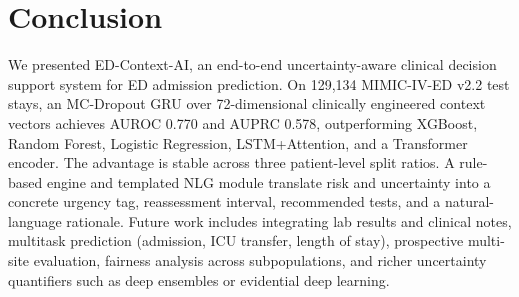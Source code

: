 \documentclass[runningheads]{llncs}
\begin{document}
\section{Conclusion}

We presented ED-Context-AI, an end-to-end uncertainty-aware clinical decision support system for ED admission prediction. On 129{,}134 MIMIC-IV-ED v2.2 test stays, an MC-Dropout GRU over 72-dimensional clinically engineered context vectors achieves AUROC 0.770 and AUPRC 0.578, outperforming XGBoost, Random Forest, Logistic Regression, LSTM+Attention, and a Transformer encoder. The advantage is stable across three patient-level split ratios. A rule-based engine and templated NLG module translate risk and uncertainty into a concrete urgency tag, reassessment interval, recommended tests, and a natural-language rationale. Future work includes integrating lab results and clinical notes, multitask prediction (admission, ICU transfer, length of stay), prospective multi-site evaluation, fairness analysis across subpopulations, and richer uncertainty quantifiers such as deep ensembles or evidential deep learning.
\end{document}
